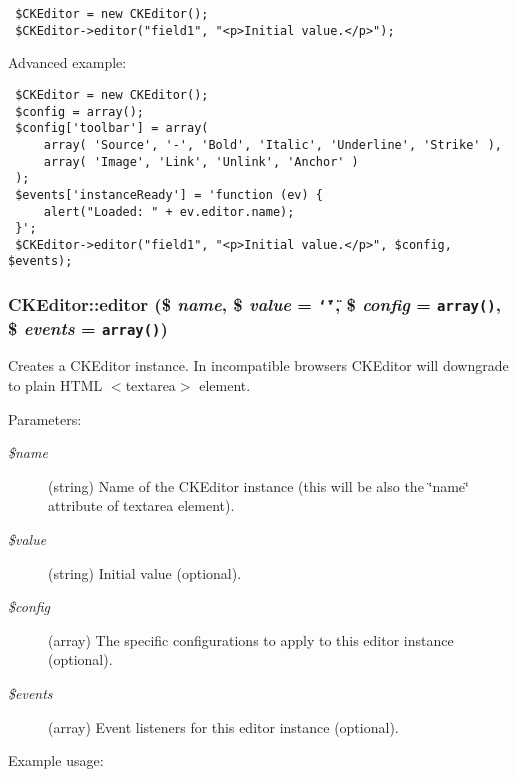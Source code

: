 \begin{Code}\begin{verbatim} $CKEditor = new CKEditor();
 $CKEditor->editor("field1", "<p>Initial value.</p>");
\end{verbatim}
\end{Code}



Advanced example: 

\begin{Code}\begin{verbatim} $CKEditor = new CKEditor();
 $config = array();
 $config['toolbar'] = array(
     array( 'Source', '-', 'Bold', 'Italic', 'Underline', 'Strike' ),
     array( 'Image', 'Link', 'Unlink', 'Anchor' )
 );
 $events['instanceReady'] = 'function (ev) {
     alert("Loaded: " + ev.editor.name);
 }';
 $CKEditor->editor("field1", "<p>Initial value.</p>", $config, $events);
\end{verbatim}
\end{Code}

 \hypertarget{classCKEditor_bd6f81ca7539169b55b8f0556bc594c6}{
\subsubsection[{editor}]{\setlength{\rightskip}{0pt plus 5cm}CKEditor::editor (\$ {\em name}, \/  \$ {\em value} = {\tt \char`\"{}\char`\"{}}, \/  \$ {\em config} = {\tt array()}, \/  \$ {\em events} = {\tt array()})}}
\label{classCKEditor_bd6f81ca7539169b55b8f0556bc594c6}


Creates a CKEditor instance. In incompatible browsers CKEditor will downgrade to plain HTML $<$textarea$>$ element.

\begin{Desc}
\item[Parameters:]
\begin{description}
\item[{\em \$name}](string) Name of the CKEditor instance (this will be also the \char`\"{}name\char`\"{} attribute of textarea element). \item[{\em \$value}](string) Initial value (optional). \item[{\em \$config}](array) The specific configurations to apply to this editor instance (optional). \item[{\em \$events}](array) Event listeners for this editor instance (optional).\end{description}
\end{Desc}
Example usage: 

